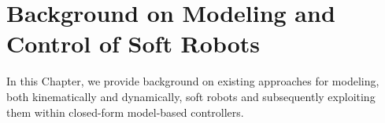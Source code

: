 \chapter{Background on Modeling and Control of Soft Robots}\label{chp:background}

In this Chapter, we provide background on existing approaches for modeling, both kinematically and dynamically, soft robots and subsequently exploiting them within closed-form model-based controllers.



